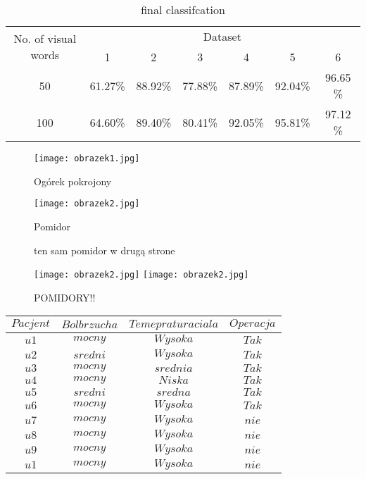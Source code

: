 \documentclass{article}
\begin{document}
\begin{table}
\centering	
		\begin{tabular}{|c|c|c|c|c|c|c|}
		\hline
		\multirow{2}{*}{No. of visual words}
		& \multicolumn{6}{c|}{Dataset} \\ \cline{2-7}
      & 1 & 2 & 3 & 4 & 5 & 6 \\ \hline
		50 & 61.27\% & 88.92\% &77.88\%& 87.89\%
		& 92.04\% & 96.65 \% \\ \hline
		100 & 64.60\% & 89.40\% &80.41\%& 92.05\%
		& 95.81\% & 97.12 \% \\ \hline
		\end{tabular}
	\caption{final classifcation}
	\label{tab:final}
\end{table}
\begin{figure}[h!]
\caption{Ogórek pokrojony}
\centering
  \texttt{[image: obrazek1.jpg]}
	\end{figure}
	\begin{figure}[h!]
\caption{Pomidor}
\centering
  \texttt{[image: obrazek2.jpg]}
	\end{figure}	
	\begin{figure}[h!]
	\centering
	\caption{ten sam pomidor w drugą strone}
	\end{figure}
		\begin{figure}[here]
		\vspace{0pt}
		\begin{center}
		\texttt{[image: obrazek2.jpg]}
		\texttt{[image: obrazek2.jpg]}
		\caption{POMIDORY!!}
		\end{center}
		\vspace{0pt}
		\end{figure}
		
		\begin{table}
			\centering
				\begin{tabular}{c|ccc}
				\hline
				\hline
				$Pacjent$ & $Bol brzucha$ & $Temepratura ciala$ & $Operacja$ \\ \hline
				$u1$& $mocny$ & $Wysoka$ & $Tak$  \\
				$u2$& $sredni$& $Wysoka$ & $Tak$ \\
				$u3$& $mocny$ & $srednia$& $Tak$  \\
				$u4$& $mocny$ & $Niska$ & $Tak$  \\
				$u5$& $sredni$& $sredna$ & $Tak$  \\
				$u6$& $mocny$ & $Wysoka$ & $Tak$  \\
				$u7$& $mocny$ & $Wysoka$ & $nie$  \\
				$u8$& $mocny$ & $Wysoka$ & $nie$  \\
				$u9$& $mocny$ & $Wysoka$ & $nie$  \\
				$u1$& $mocny$ & $Wysoka$ & $nie$  \\
				\hline
				\hline
		\end{tabular}
		\end{table}
		
\end{document}
